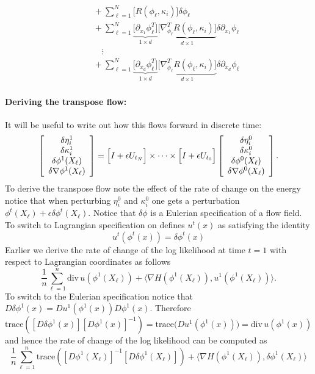 \documentclass[noinfoline]{imsart}
\begin{document}
{\begin{align}
 &\quad+ \sum_{\ell=1}^N \bigl[R(\phi_\ell,\kappa_i)\bigr] \delta\phi_\ell \\
 &\quad+\sum_{\ell=1}^N\underbrace{\bigl[\partial_{x_1}{\phi}_\ell^T \bigr]}_{1 \times d}  \underbrace{\bigl[ \nabla^T_{\phi_\ell}R(\phi_\ell,\kappa_i)\bigr]}_{d\times 1}  \delta\partial_{x_1}\phi_\ell\\
 &\qquad\vdots \nonumber\\
&\quad+\sum_{\ell=1}^N\underbrace{\bigl[\partial_{x_d}{\phi}_\ell^T \bigr]}_{1 \times d}  \underbrace{\bigl[ \nabla^T_{\phi_\ell}R(\phi_\ell,\kappa_i)\bigr]}_{d\times 1}  \delta\partial_{x_d}\phi_\ell
\end{align}


\paragraph{Deriving the transpose flow:}
It will be useful to write out how this flows forward in discrete time:
\begin{equation}
\label{forwardTT}
 \left[\begin{array}{c} \delta\eta^1_i\\ \delta \kappa^1_i \\ \delta\phi^1(X_\ell) \\ \delta \nabla\phi^1(X_\ell)   \end{array}\right]
 = \Bigl[I+\epsilon U_{t_N} \Bigr]\times \cdots \times  \Bigl[I+\epsilon U_{t_0} \Bigr]  \left[\begin{array}{c} \delta\eta^0_i\\ \delta \kappa^0_i \\ \delta\phi^0(X_\ell) \\ \delta \nabla\phi^0(X_\ell)   \end{array}\right].
\end{equation}
To derive the transpose flow note the effect of the rate of change on the energy notice that when perturbing $\eta^0_i$ and $\kappa^0_i$ one gets a perturbation  $\phi^t(X_\ell) +\epsilon \delta \phi^t(X_\ell)$. Notice that $\delta \phi$ is a Eulerian specification of a flow field.  To switch to Lagrangian specification on defines $u^t(x)$ as satisfying the identity
\[ u^t (\phi^t(x))=\delta \phi^t(x)\]
Earlier we derive the rate of change of the log likelihood at time $t=1$ with respect to Lagrangian coordinates as follows
\[  \frac{1}{n} \sum_{\ell=1}^n \text{div}\, u (\phi^1(X_\ell)) + \bigl\langle \nabla H (\phi^1(X_\ell)), u^1(\phi^1(X_\ell))\bigr\rangle.  \]
 To switch to the Eulerian specification notice that $D\delta \phi^1 (x) =  Du^1 (\phi^1(x)) D\phi^1(x) $. Therefore $\text{trace} ([D\delta \phi^1 (x)][ D\phi^1(x)]^{-1} ) = \text{trace}\bigl( Du^1 (\phi^1(x))\bigr)  =  \text{div}\, u (\phi^1(x))$ and hence the rate of change of the log likelihood can be computed as
\begin{equation}
\label{Eulerian}
\frac{1}{n} \sum_{\ell=1}^n \text{trace} ([ D\phi^1(X_\ell)]^{-1} [D\delta \phi^1 (X_\ell)]) + \bigl\langle \nabla H (\phi^1(X_\ell)), \delta \phi^1(X_\ell)\bigr\rangle
\end{equation}

}
\end{document}
